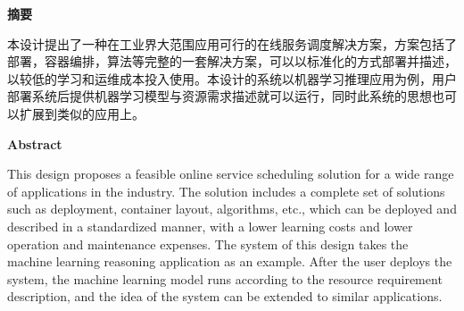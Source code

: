 \begin{center}
    \bfseries {} 摘要
\end{center}

本设计提出了一种在工业界大范围应用可行的在线服务调度解决方案，方案包括了部署，容器编排，算法等完整的一套解决方案，可以以标准化的方式部署并描述，以较低的学习和运维成本投入使用。本设计的系统以机器学习推理应用为例，用户部署系统后提供机器学习模型与资源需求描述就可以运行，同时此系统的思想也可以扩展到类似的应用上。

\begin{center}
    \bfseries {} Abstract
\end{center}

This design proposes a feasible online service scheduling solution for a wide range of applications in the industry. The solution includes a complete set of solutions such as deployment, container layout, algorithms, etc., which can be deployed and described in a standardized manner, with a lower learning costs and lower operation and maintenance expenses. The system of this design takes the machine learning reasoning application as an example. After the user deploys the system, the machine learning model runs according to the resource requirement description, and the idea of the system can be extended to similar applications.
